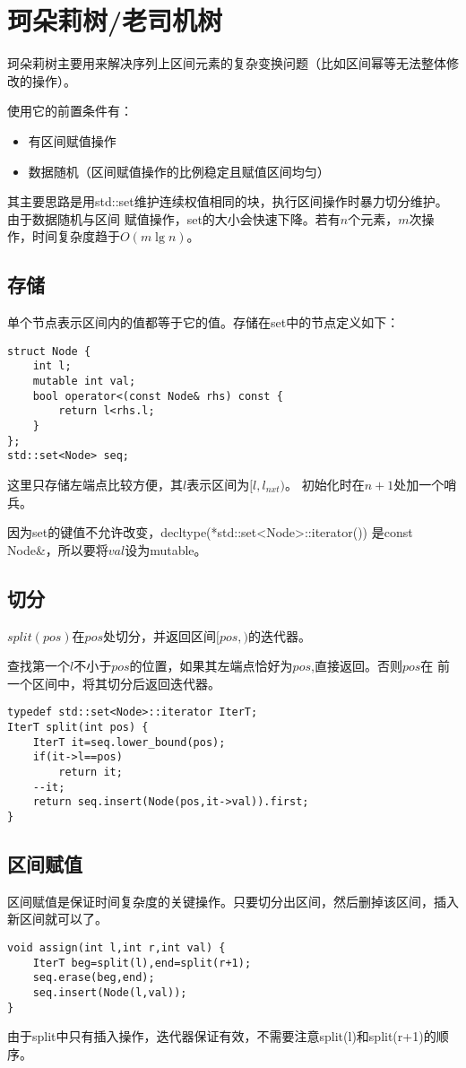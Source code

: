 \section{珂朵莉树/老司机树}
珂朵莉树主要用来解决序列上区间元素的复杂变换问题（比如区间幂等无法整体修改的操作）。

使用它的前置条件有：
\begin{itemize}
    \item 有区间赋值操作
    \item 数据随机（区间赋值操作的比例稳定且赋值区间均匀）
\end{itemize}

其主要思路是用std::set维护连续权值相同的块，执行区间操作时暴力切分维护。由于数据随机与区间
赋值操作，set的大小会快速下降。若有$n$个元素，$m$次操作，时间复杂度趋于$O(m\lg n)$。

\subsection{存储}
单个节点表示区间内的值都等于它的值。存储在set中的节点定义如下：
\begin{lstlisting}
struct Node {
    int l;
    mutable int val;
    bool operator<(const Node& rhs) const {
        return l<rhs.l;
    }
};
std::set<Node> seq;
\end{lstlisting}
这里只存储左端点比较方便，其$l$表示区间为$[l,l_{nxt})$。
初始化时在$n+1$处加一个哨兵。

因为set的键值不允许改变，decltype(*std::set<Node>::iterator())
是const Node\&，所以要将$val$设为mutable。
\subsection{切分}
$split(pos)$在$pos$处切分，并返回区间$[pos,)$的迭代器。

查找第一个$l$不小于$pos$的位置，如果其左端点恰好为$pos$,直接返回。否则$pos$在
前一个区间中，将其切分后返回迭代器。

\begin{lstlisting}
typedef std::set<Node>::iterator IterT;
IterT split(int pos) {
    IterT it=seq.lower_bound(pos);
    if(it->l==pos)
        return it;
    --it;
    return seq.insert(Node(pos,it->val)).first;
}
\end{lstlisting}
\subsection{区间赋值}
区间赋值是保证时间复杂度的关键操作。只要切分出区间，然后删掉该区间，插入
新区间就可以了。
\begin{lstlisting}
void assign(int l,int r,int val) {
    IterT beg=split(l),end=split(r+1);
    seq.erase(beg,end);
    seq.insert(Node(l,val));
}
\end{lstlisting}
由于split中只有插入操作，迭代器保证有效，不需要注意split(l)和split(r+1)的顺序。
